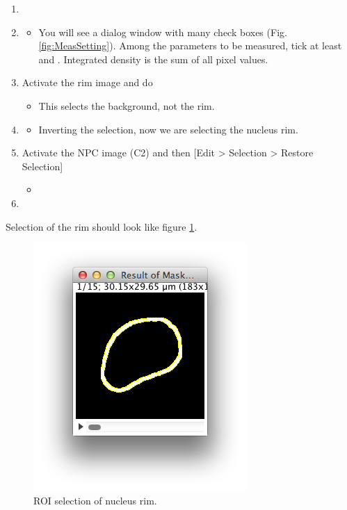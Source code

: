 \begin{enumerate}
  \item {}
  \item {}
  \begin{itemize}
    \item You will see a dialog window with many check boxes (Fig. \ref{fig:MeasSetting}). Among the parameters to be measured, tick at least  and . Integrated density is the sum of all pixel values. 
  \end{itemize}
  \item Activate the rim image and do 
  \begin{itemize}
    \item This selects the background, not the rim. 
  \end{itemize}
  \item {}
  \begin{itemize}
    \item Inverting the selection, now we are selecting the nucleus rim. 
  \end{itemize}
  \item Activate the NPC image (C2) and then [Edit > Selection > Restore Selection]
  \begin{itemize}
      \item 
  \end{itemize}
  \item {}
\end{enumerate}

Selection of the rim should look like figure \ref{fig_RoiNucRim}.

\begin{figure}[ht!]
\begin{center}
\includegraphics[scale=0.8]{fig/ROIselectionNucRim.png}
\caption{ROI selection of nucleus rim. }
\label{fig_RoiNucRim}
\end{center}
\end{figure}

